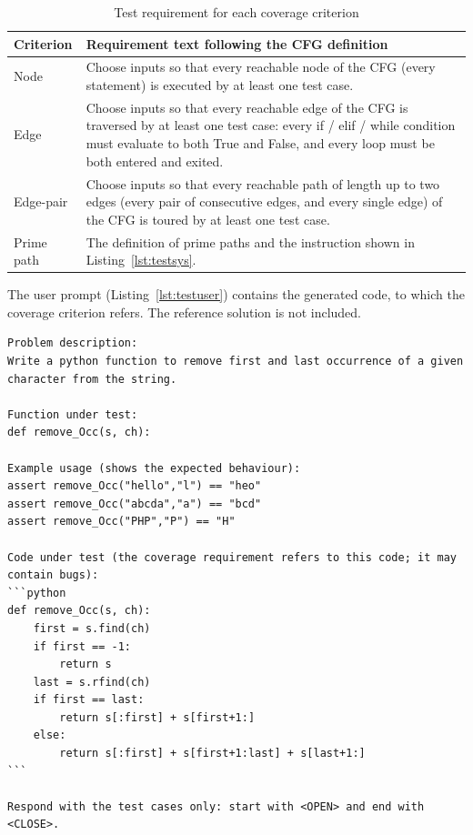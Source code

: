 \documentclass[11pt, a4paper]{article}
\begin{document}
\begin{table}[H]
    \centering
    \small
    \begin{tabularx}{\textwidth}{>{\raggedright\arraybackslash}p{2.6cm}X}
        \toprule
        \textbf{Criterion} & \textbf{Requirement text following the CFG definition} \\
        \midrule
        Node & Choose inputs so that every reachable node of the CFG (every statement) is executed by at least one test case. \\
        Edge & Choose inputs so that every reachable edge of the CFG is traversed by at least one test case: every if / elif / while condition must evaluate to both True and False, and every loop must be both entered and exited. \\
        Edge-pair & Choose inputs so that every reachable path of length up to two edges (every pair of consecutive edges, and every single edge) of the CFG is toured by at least one test case. \\
        Prime path & The definition of prime paths and the instruction shown in Listing~\ref{lst:testsys}. \\
        \bottomrule
    \end{tabularx}
    \caption{Test requirement for each coverage criterion}
    \label{tab:requirements}
\end{table}

The user prompt (Listing~\ref{lst:testuser}) contains the generated code, to which the coverage criterion refers. The reference solution is not included.

\begin{lstlisting}[style=text, caption={User prompt of the Test Case Generator for task 11}, label={lst:testuser}]
Problem description:
Write a python function to remove first and last occurrence of a given character from the string.

Function under test:
def remove_Occ(s, ch):

Example usage (shows the expected behaviour):
assert remove_Occ("hello","l") == "heo"
assert remove_Occ("abcda","a") == "bcd"
assert remove_Occ("PHP","P") == "H"

Code under test (the coverage requirement refers to this code; it may contain bugs):
```python
def remove_Occ(s, ch):
    first = s.find(ch)
    if first == -1:
        return s
    last = s.rfind(ch)
    if first == last:
        return s[:first] + s[first+1:]
    else:
        return s[:first] + s[first+1:last] + s[last+1:]
```

Respond with the test cases only: start with <OPEN> and end with <CLOSE>.
\end{lstlisting}
\end{document}

